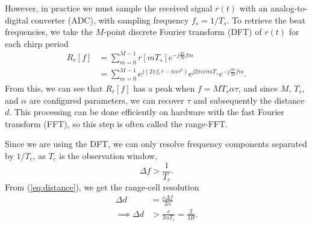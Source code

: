 However, in practice we must sample the received signal $r(t)$ with an
analog-to-digital converter (ADC), with sampling frequency $f_s = 1/T_s$. To retrieve
the beat frequencies, we take the $M$-point discrete Fourier transform (DFT)
\cite{vetterli2014foundations} of $r(t)$ for each chirp period
\begin{align}
	R_r[f] &= \sum_{m=0}^{M-1} r[mT_s] e^{-j\frac{2\pi}{M}fm} \label{eq:range-fft}\\
	&= \sum_{m=0}^{M-1} e^{j(2\pi f_c\tau -
	\pi\alpha\tau^2)}e^{j2\pi\alpha\tau mT_s} e^{-j\frac{2\pi}{M}fm}.
\end{align}
From this, we can see that $R_r[f]$ has a peak when $f=MT_s\alpha\tau$, and since
$M$, $T_s$, and $\alpha$ are configured parameters, we can recover $\tau$ and
subsequently the distance $d$.
This processing can be done efficiently on hardware with the fast Fourier transform (FFT),
so this step is often called the range-FFT. 

Since we are using the DFT, we can only resolve frequency components
separated by $1/T_c$, as $T_c$ is the observation window,
\begin{equation}
	\Delta f > \frac{1}{T_c}.	
\end{equation}
From (\ref{eq:distance}), we get the range-cell resolution
\begin{align}
	\Delta d &= \frac{c\Delta f}{2\alpha}\\
	\implies \Delta d &> \frac{c}{2\alpha T_c} = \frac{2}{2B}. \label{eq:range-res}
\end{align}

